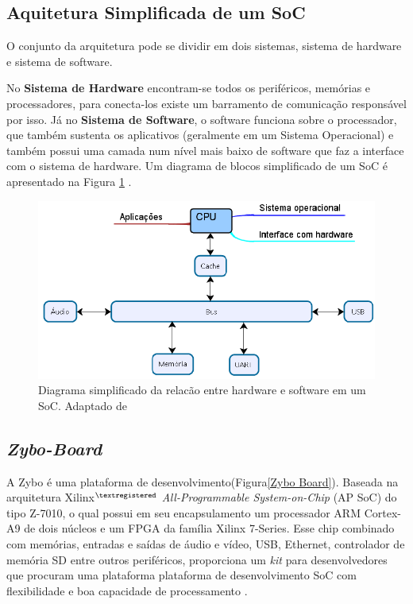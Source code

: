 \subsection{Aquitetura Simplificada de um SoC}

O conjunto da arquitetura pode se dividir em dois sistemas, sistema de hardware  e sistema de software. 


No \textbf{Sistema de Hardware} encontram-se todos os periféricos, memórias e processadores, para conecta-los existe um barramento de comunicação responsável por isso. Já no \textbf{Sistema de Software}, o software funciona sobre o processador, que também sustenta os aplicativos (geralmente em um Sistema Operacional)  e também possui uma camada num nível mais baixo de software que 
faz a interface com o sistema de hardware. Um diagrama de blocos simplificado de um SoC é apresentado na Figura \ref{diagram SoC} \cite{zynqBook}.
\pagebreak

\begin{figure}[h]
	\centering
	\includegraphics[keepaspectratio=true,scale=0.5]{figuras/diaagrama-soc.png}
	\caption{Diagrama simplificado da relacão entre hardware e software em um SoC. Adaptado de \cite{cao2017post}}
	\label{diagram SoC}
\end{figure}


\subsection{\textit{Zybo-Board}}
A Zybo é uma plataforma de desenvolvimento(Figura\ref{Zybo Board}).
Baseada na arquitetura Xilinx$^{\textregistered}$ \textit{All-Programmable System-on-Chip} (AP SoC)
do tipo Z-7010, o qual possui em seu encapsulamento um processador ARM Cortex-A9 de 
dois núcleos e um FPGA da família Xilinx 7-Series. Esse chip combinado com memórias, entradas 
e saídas de áudio e vídeo, USB, Ethernet, controlador de memória SD entre outros periféricos,
proporciona um \textit{kit} para desenvolvedores que procuram uma plataforma plataforma de desenvolvimento SoC com flexibilidade e boa capacidade de processamento \cite{DigilentZybo}.  

